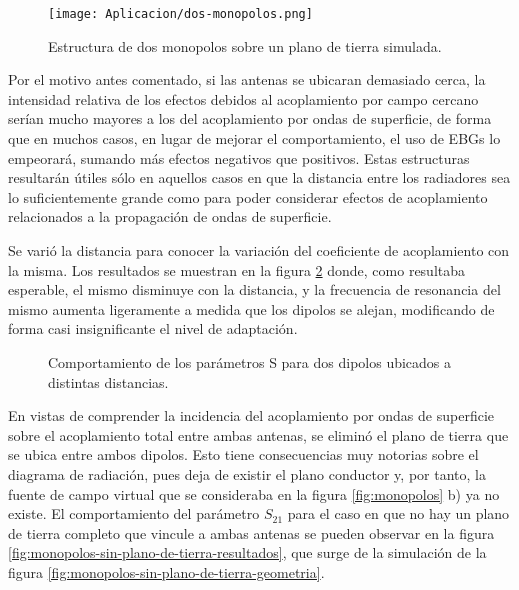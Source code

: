 \begin{figure}[h]
	\centering
	\texttt{[image: Aplicacion/dos-monopolos.png]}
	\caption{Estructura de dos monopolos sobre un plano de tierra simulada.}
	\label{fig:dos-monopolos}
\end{figure}

Por el motivo antes comentado, si las antenas se ubicaran demasiado cerca, la intensidad relativa de los efectos debidos al acoplamiento por campo cercano serían mucho mayores a los del acoplamiento por ondas de superficie, de forma que en muchos casos, en lugar de mejorar el comportamiento, el uso de EBGs lo empeorará, sumando más efectos negativos que positivos. Estas estructuras resultarán útiles sólo en aquellos casos en que la distancia entre los radiadores sea lo suficientemente grande como para poder considerar efectos de acoplamiento relacionados a la propagación de ondas de superficie.

Se varió la distancia para conocer la variación del coeficiente de acoplamiento con la misma. Los resultados se muestran en la figura \ref{fig:dipolos-distancia-resultados} donde, como resultaba esperable, el mismo disminuye con la distancia, y la frecuencia de resonancia del mismo aumenta ligeramente a medida que los dipolos se alejan, modificando de forma casi insignificante el nivel de adaptación.

\begin{figure}[h]
	\centering 
	\hspace{0pt}
	\caption{Comportamiento de los parámetros S para dos dipolos ubicados a distintas distancias.}
	\label{fig:dipolos-distancia-resultados}	
\end{figure}  

En vistas de comprender la incidencia del acoplamiento por ondas de superficie sobre el acoplamiento total entre ambas antenas, se eliminó el plano de tierra que se ubica entre ambos dipolos. Esto tiene consecuencias muy notorias sobre el diagrama de radiación, pues deja de existir el plano conductor y, por tanto, la fuente de campo virtual que se consideraba en la figura \ref{fig:monopolos} b) ya no existe. El comportamiento del parámetro $S_{21}$ para el caso en que no hay un plano de tierra completo que vincule a ambas antenas se pueden observar en la figura \ref{fig:monopolos-sin-plano-de-tierra-resultados}, que surge de la simulación de la figura \ref{fig:monopolos-sin-plano-de-tierra-geometria}. 


